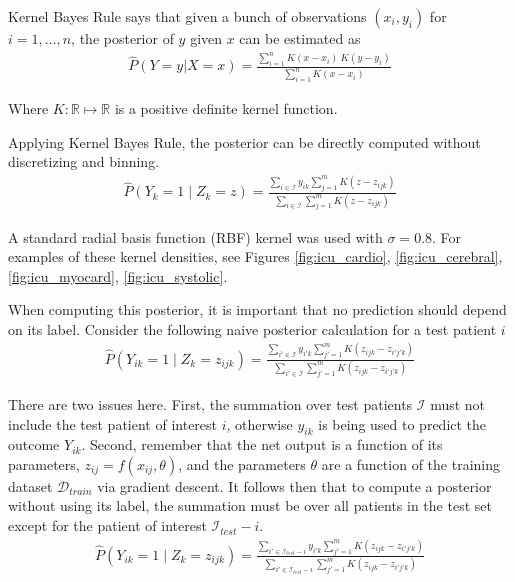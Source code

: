 Kernel Bayes Rule says that given a bunch of observations $(x_i, y_i)$ for $i = 1, \dots, n$, the posterior of $y$ given $x$ can be estimated as
\begin{gather}
    \hat{P}(Y = y | X = x) = \frac
        {\sum_{i=1}^n K(x - x_i) \ K(y - y_i)}
        {\sum_{i=1}^n K(x - x_i)}
\end{gather}

Where $K: \mathbb{R} \mapsto \mathbb{R}$ is a positive definite kernel function.

Applying Kernel Bayes Rule, the posterior can be directly computed without discretizing and binning.
\begin{gather}
    \hat{P}(Y_k = 1 \mid Z_k = z) = \frac
        {\sum_{i \in \mathcal{I}} y_{ik} \sum_{j=1}^m K(z - z_{ijk})}
        {\sum_{i \in \mathcal{I}} \sum_{j=1}^m K(z - z_{ijk})}
\end{gather}

A standard radial basis function (RBF) kernel was used with $\sigma = 0.8$.  For examples of these kernel densities, see Figures \ref{fig:icu_cardio}, \ref{fig:icu_cerebral}, \ref{fig:icu_myocard}, \ref{fig:icu_systolic}.

When computing this posterior, it is important that no prediction should depend on its label.  Consider the following naive posterior calculation for a test patient $i$
\begin{gather}
    \hat{P}(Y_{ik} = 1 \mid Z_k = z_{ijk}) = \frac
        {\sum_{i' \in \mathcal{I}} y_{i'k} \sum_{j'=1}^m K(z_{ijk} - z_{i'j'k})}
        {\sum_{i' \in \mathcal{I}} \sum_{j'=1}^m K(z_{ijk} - z_{i'j'k})}
\end{gather}

There are two issues here.  First, the summation over test patients $\mathcal{I}$ must not include the test patient of interest $i$, otherwise $y_{ik}$ is being used to predict the outcome $Y_{ik}$.  Second, remember that the net output is a function of its parameters, $z_{ij} = f(x_{ij}, \theta)$, and the parameters $\theta$ are a function of the training dataset $\mathcal{D}_{train}$ via gradient descent.  It follows then that to compute a posterior without using its label, the summation must be over all patients in the test set except for the patient of interest $\mathcal{I}_{test} - i$.
\begin{gather}
    \hat{P}(Y_{ik} = 1 \mid Z_k = z_{ijk}) = \frac
        {\sum_{i' \in \mathcal{I}_{test} - i} y_{i'k} \sum_{j'=1}^m K(z_{ijk} - z_{i'j'k})}
        {\sum_{i' \in \mathcal{I}_{test} - i} \sum_{j'=1}^m K(z_{ijk} - z_{i'j'k})}
\end{gather}

